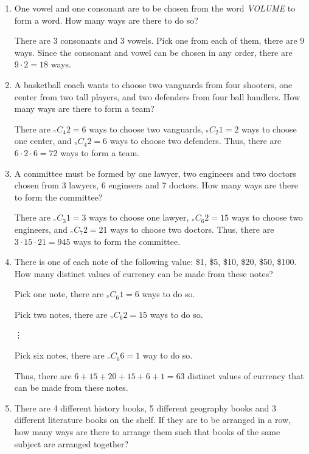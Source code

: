 \documentclass{report}
\newcommand\comb[2][^n]{{}_{#1}C_{#2}}
\begin{document}
\begin{multicols}{2}
\begin{enumerate}
    \item One vowel and one consonant are to be chosen from the word \textit{VOLUME} to
          form a word. How many ways are there to do so? \sol{}

          There are 3 consonants and 3 vowels. Pick one from each of them, there are 9
          ways. Since the consonant and vowel can be chosen in any order, there are $9
            \cdot 2 = 18$ ways.

    \item A basketball coach wants to choose two vanguards from four shooters, one center
          from two tall players, and two defenders from four ball handlers. How many ways
          are there to form a team? \sol{}

          There are $\comb{4}{2} = 6$ ways to choose two vanguards, $\comb{2}{1} = 2$
          ways to choose one center, and $\comb{4}{2} = 6$ ways to choose two defenders.
          Thus, there are $6 \cdot 2 \cdot 6 = 72$ ways to form a team.

    \item A committee must be formed by one lawyer, two engineers and two doctors chosen
          from 3 lawyers, 6 engineers and 7 doctors. How many ways are there to form the
          committee? \sol{}

          There are $\comb{3}{1} = 3$ ways to choose one lawyer, $\comb{6}{2} = 15$ ways
          to choose two engineers, and $\comb{7}{2} = 21$ ways to choose two doctors.
          Thus, there are $3 \cdot 15 \cdot 21 = 945$ ways to form the committee.

    \item  There is one of each note of the following value: \$1, \$5, \$10, \$20, \$50,
          \$100. How many distinct values of currency can be made from these notes?

          \sol{}

          Pick one note, there are $\comb{6}{1} = 6$ ways to do so.

          Pick two notes, there are $\comb{6}{2} = 15$ ways to do so.

          \vdots

          Pick six notes, there are $\comb{6}{6} = 1$ way to do so.

          Thus, there are $6 + 15 + 20 + 15 + 6 + 1 = 63$ distinct values of currency
          that can be made from these notes.

    \item There are 4 different history books, 5 different geography books and 3
          different literature books on the shelf. If they are to be arranged in a row,
          how many ways are there to arrange them such that books of the same subject are
          arranged together?


\end{enumerate}
\end{multicols}
\end{document}
